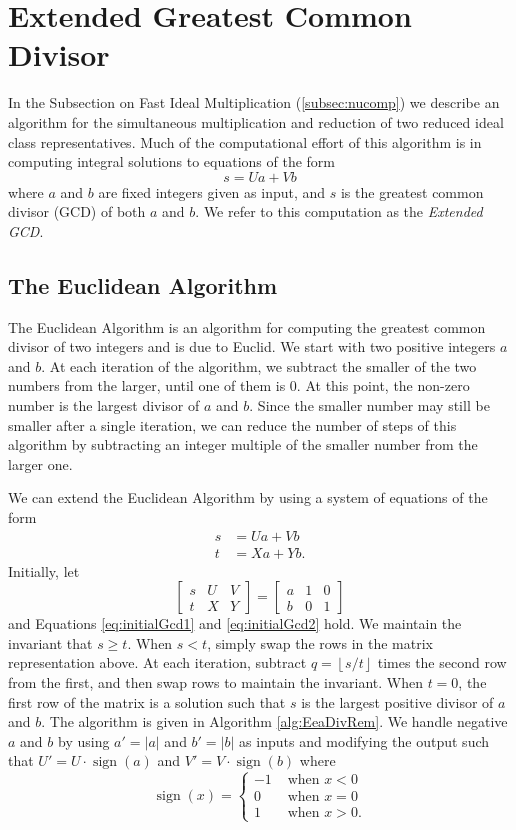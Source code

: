 \documentclass{ucalgthes1}
\theoremstyle{definition}
\DeclareMathOperator{\sign}{sign}
\newcommand{\matrixThreeTwo}[6]{\left[ \begin{array}{rrr} #1 & #2 & #3 \\ #4 & #5 & #6 \end{array} \right]}
\newcommand{\floor}[1]{\left\lfloor #1 \right\rfloor}
\begin{document}
\section{Extended Greatest Common Divisor}
\label{sec:eea}

In the Subsection on Fast Ideal Multiplication (\ref{subsec:nucomp}) we describe an algorithm for the simultaneous multiplication and reduction of two reduced ideal class representatives.  Much of the computational effort of this algorithm is in computing integral solutions to equations of the form
\[
	s = Ua + Vb
\]
where $a$ and $b$ are fixed integers given as input, and $s$ is the greatest common divisor (GCD) of both $a$ and $b$.  We refer to this computation as the \emph{Extended GCD}.

\subsection{The Euclidean Algorithm}

The Euclidean Algorithm is an algorithm for computing the greatest common divisor of two integers and is due to Euclid.  We start with two positive integers $a$ and $b$.  At each iteration of the algorithm, we subtract the smaller of the two numbers from the larger, until one of them is 0. At this point, the non-zero number is the largest divisor of $a$ and $b$.  Since the smaller number may still be smaller after a single iteration, we can reduce the number of steps of this algorithm by subtracting an integer multiple of the smaller number from the larger one.

We can extend the Euclidean Algorithm by using a system of equations of the form
\begin{align}
s &= Ua + Vb \label{eq:initialGcd1} \\
t &= Xa + Yb. \label{eq:initialGcd2}
\end{align}
Initially, let
\[
\matrixThreeTwo{s}{U}{V}{t}{X}{Y} = \matrixThreeTwo{a}{1}{0}{b}{0}{1}
\]
and Equations \ref{eq:initialGcd1} and \ref{eq:initialGcd2} hold.  We maintain the invariant that $s \ge t$.  When $s < t$, simply swap the rows in the matrix representation above.  At each iteration, subtract $q = \floor{s/t}$ times the second row from the first, and then swap rows to maintain the invariant.  When $t=0$, the first row of the matrix is a solution such that $s$ is the largest positive divisor of $a$ and $b$.  The algorithm is given in Algorithm \ref{alg:EeaDivRem}.  We handle negative $a$ and $b$ by using $a' = |a|$ and $b' = |b|$ as inputs and modifying the output such that $U' = U \cdot \sign(a)$ and $V' = V \cdot \sign(b)$ where
\[
	\sign(x) = \begin{cases}
		-1 & \textrm{ when } x < 0 \\
		0 & \textrm{ when } x = 0 \\
		1 & \textrm{ when } x > 0.
	\end{cases}
\]
\end{document}
